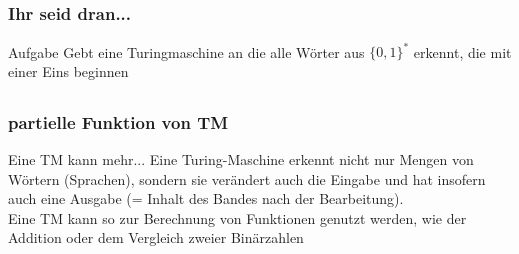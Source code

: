 \subsection*{}
\begin{frame}
  \frametitle{Ihr seid dran...}

  \begin{block}{Aufgabe}
	Gebt eine Turingmaschine an die alle Wörter aus $\{0,1\}^*$ erkennt, die mit einer Eins beginnen
	\end{block}
  \end{frame}


\subsection*{}
\begin{frame}
  \frametitle{partielle Funktion von TM}
\begin{block}{Eine TM kann mehr...}
Eine Turing-Maschine erkennt nicht nur Mengen von Wörtern (Sprachen), sondern sie verändert auch die Eingabe und hat insofern auch eine
Ausgabe (= Inhalt des Bandes nach der Bearbeitung).\\
Eine TM kann so zur Berechnung von Funktionen genutzt werden, wie der Addition oder dem Vergleich zweier Binärzahlen
\end{block}
\end{frame}

